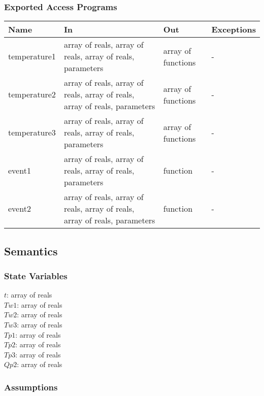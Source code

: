 \documentclass[12pt]{article}
\begin{document}
\subsubsection{Exported Access Programs}

\begin{center}
\begin{tabular}{p{3cm} p{5cm} p{4cm} p{2cm}}
\hline
\textbf{Name} & \textbf{In} & \textbf{Out} & \textbf{Exceptions} \\
\hline
temperature1 & array of reals, array of reals, array of reals, parameters & array of functions & - \\
\hline
temperature2 & array of reals, array of reals, array of reals, array of reals, parameters & array of functions & - \\
\hline
temperature3 & array of reals, array of reals, array of reals, parameters & array of functions & - \\
\hline
event1 & array of reals, array of reals, array of reals, parameters & function & - \\
\hline
event2 & array of reals, array of reals, array of reals, array of reals, parameters & function & - \\
\hline
\end{tabular}
\end{center}

\subsection{Semantics}

\subsubsection{State Variables}

$t$: array of reals \\
$Tw1$: array of reals \\
$Tw2$: array of reals \\
$Tw3$: array of reals \\
$Tp1$: array of reals \\
$Tp2$: array of reals \\
$Tp3$: array of reals \\
$Qp2$: array of reals 

\subsubsection{Assumptions}
\end{document}
